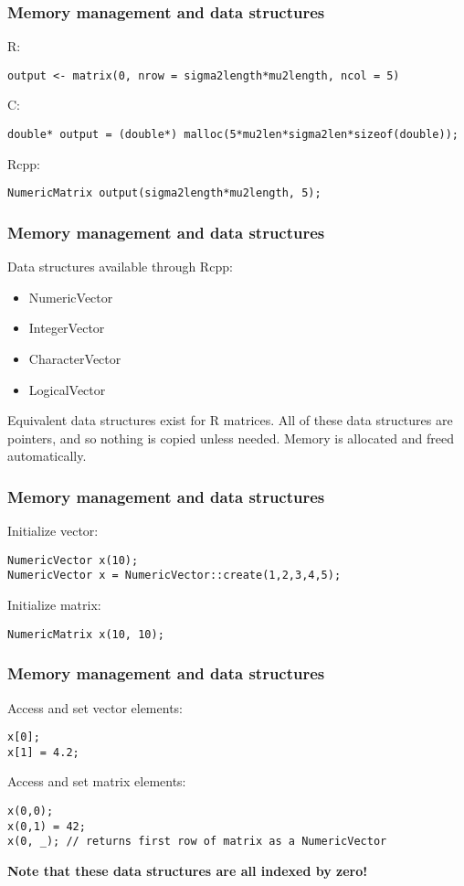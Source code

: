 \documentclass[10pt, compress]{beamer}
\begin{document}
\begin{frame}[fragile]
  \frametitle{Memory management and data structures}
    R:
    \begin{Verbatim}[fontsize=\footnotesize]
output <- matrix(0, nrow = sigma2length*mu2length, ncol = 5)
    \end{Verbatim}
    C:
    \begin{Verbatim}[fontsize=\footnotesize]
double* output = (double*) malloc(5*mu2len*sigma2len*sizeof(double));
    \end{Verbatim}
    Rcpp:
    \begin{Verbatim}[fontsize=\footnotesize]
NumericMatrix output(sigma2length*mu2length, 5);
    \end{Verbatim}

\end{frame}

\begin{frame}[fragile]
  \frametitle{Memory management and data structures}
  Data structures available through Rcpp:
  \begin{itemize}
    \item NumericVector
    \item IntegerVector
    \item CharacterVector
    \item LogicalVector
  \end{itemize}
  Equivalent data structures exist for R matrices.
  All of these data structures are pointers, and so nothing is copied unless needed.
  Memory is allocated and freed automatically.
\end{frame}

\begin{frame}[fragile]
\frametitle{Memory management and data structures}
Initialize vector:
\begin{verbatim}
NumericVector x(10);
NumericVector x = NumericVector::create(1,2,3,4,5);
\end{verbatim}
Initialize matrix:
\begin{verbatim}
NumericMatrix x(10, 10);
\end{verbatim}
\end{frame}

\begin{frame}[fragile]
\frametitle{Memory management and data structures}
Access and set vector elements:
\begin{Verbatim}[fontsize=\small]
x[0];
x[1] = 4.2;
\end{Verbatim}
Access and set matrix elements:
\begin{Verbatim}[fontsize=\small]
x(0,0); 
x(0,1) = 42;
x(0, _); // returns first row of matrix as a NumericVector
\end{Verbatim}
\textbf{Note that these data structures are all indexed by zero!}
\end{frame}
\end{document}

